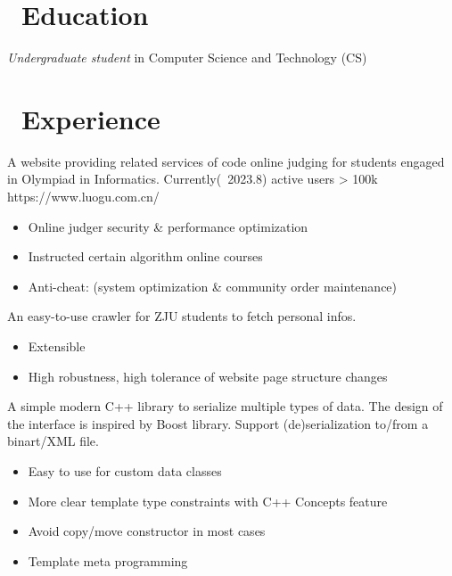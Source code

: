 \documentclass{resume}
\begin{document}



\section{\faGraduationCap\ Education}
\textit{Undergraduate student} in Computer Science and Technology (CS)

\section{\faUsers\ Experience}
A website providing related services of code online judging for students engaged in Olympiad in Informatics.  
Currently(~2023.8) active users > 100k
https://www.luogu.com.cn/
\begin{itemize}
  \item Online judger security \& performance optimization
  \item Instructed certain algorithm online courses
  \item Anti-cheat: (system optimization \& community order maintenance)
\end{itemize}

An easy-to-use crawler for ZJU students to fetch personal infos.  
\begin{itemize}
  \item Extensible
  \item High robustness, high tolerance of website page structure changes
\end{itemize}

A simple modern C++ library to serialize multiple types of data. The design of the interface is inspired by Boost library.
Support (de)serialization to/from a binart/XML file.
\begin{itemize}
  \item Easy to use for custom data classes
  \item More clear template type constraints with C++ Concepts feature
  \item Avoid copy/move constructor in most cases
  \item Template meta programming
\end{itemize}
\end{document}
